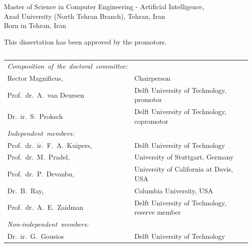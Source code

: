 \begin{titlepage}
\begin{center}
\bigskip
\bigskip

Master of Science in Computer Engineering - Artificial Intelligence, \\
Azad University (North Tehran Branch), Tehran, Iran \\
Born in Tehran, Iran
\vspace*{2\bigskipamount}

\end{center}

\clearpage
\thispagestyle{empty}

\noindent This dissertation has been approved by the promotors.

\medskip\noindent
\begin{tabular}{l}
\end{tabular}

\bigskip

\noindent
\begin{tabular}{p{4.5cm}l}

    \mbox{\emph{Composition of the doctoral committee:}} & \\
    Rector Magnificus, & Chairperson \\
    Prof.\ dr.\ A.\ van Deursen & Delft University of Technology, promotor \\
    Dr.\ ir.\ S.\ Proksch & Delft University of Technology, copromotor \\
    \mbox{\emph{Independent members:}} & \\
    Prof.\ dr.\ ir.\ F.\ A.\ Kuipers, & Delft University of Technology \\
    Prof.\ dr.\ M.\ Pradel, & University of Stuttgart, Germany \\
    Prof.\ dr.\ P.\ Devanbu, & University of California at Davis, USA \\
    Dr.\ B.\ Ray, & Columbia University, USA \\
    Prof.\ dr.\ A.\ E.\  Zaidman & Delft University of Technology, reserve member \\
    \mbox{\emph{Non-independent members:}} & \\
    Dr.\ ir.\ G.\ Gousios & Delft University of Technology \\
    

\end{tabular}
\end{titlepage}
